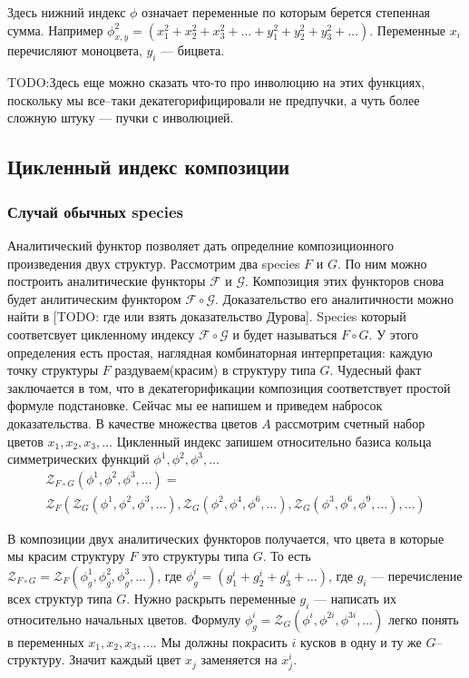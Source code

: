 Здесь нижний индекс $\phi$ означает переменные по которым берется степенная
сумма. Например $\phi_{x, y}^2 = 
(x_1^2 + x_2^2 + x_3^2 + \dots + y_1^2 + y_2^2 + y_3^2 + \dots)$.
Переменные $x_i$ перечисляют моноцвета, $y_i$ --- бицвета.

TODO:Здесь еще можно сказать что-то про инволюцию на этих функциях, поскольку мы
все--таки декатегорифицировали не предпучки, а чуть более сложную штуку ---
пучки с инволюцией.

\subsection{Цикленный индекс композиции}
\subsubsection{Случай обычных species}
Аналитический функтор позволяет дать определние композиционного произведения
двух структур. Рассмотрим два species $F$ и $G$. По ним можно построить
аналитические функторы $\mathcal F$ и $\mathcal G$. Композиция этих функторов
снова будет анлитическим функтором $\mathcal F \circ \mathcal G$. Доказательство
его аналитичности можно найти в [TODO: где или взять доказательство Дурова].
Species который соответсвует цикленному индексу $\mathcal F \circ \mathcal G$ и
будет называться $F \circ G$. У этого определения есть простая, наглядная
комбинаторная интерпретация: каждую точку структуры $F$ раздуваем(красим) в
структуру типа $G$. Чудесный факт заключается в том, что в декатегорификации
композиция соответствует простой формуле подстановке. Сейчас мы ее напишем и
приведем набросок доказательства. В качестве множества цветов $A$ рассмотрим
счетный набор цветов $x_1, x_2, x_3, \dots$ Цикленный индекс запишем
относительно базиса кольца симметрических функций $\phi^1, \phi^2, \phi^3, \dots$
\begin{multline}
\label{eq:zfg}
	\mathcal Z_{F \circ G} (\phi^1, \phi^2, \phi^3, \dots) = \\
	\mathcal Z_F(
		\mathcal Z_G(\phi^1, \phi^2, \phi^3, \dots),
		\mathcal Z_G(\phi^2, \phi^4, \phi^6, \dots),
		\mathcal Z_G(\phi^3, \phi^6, \phi^9, \dots),
		\dots
	)
\end{multline}

В композиции двух аналитических функторов получается, что цвета в которые мы
красим структуру $F$ это структуры типа $G$. То есть $\mathcal Z_{F \circ G} =
\mathcal Z_F(\phi_g^1, \phi_g^2, \phi_g^3, \dots)$, где $\phi_g^i = (g_1^i +
g_2^i + g_3^i + \dots)$, где $g_i$ --- перечисление всех структур типа $G$.
Нужно раскрыть переменные $g_i $ --- написать их относительно начальных цветов.
Формулу $\phi_g^i = \mathcal Z_G(\phi^i, \phi^{2i}, \phi^{3i}, \dots)$ легко
понять в переменных $x_1, x_2, x_3, \dots$. Мы должны покрасить $i$ кусков в
одну и ту же $G$--структуру. Значит каждый цвет $x_j$ заменяется на $x_j^i$.

